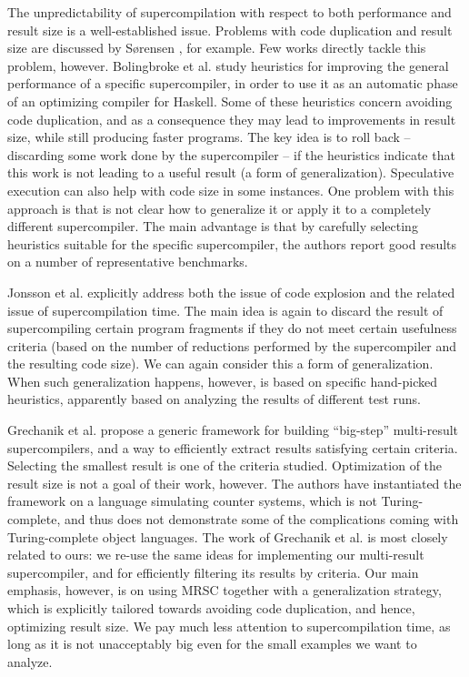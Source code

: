 \documentclass[submission,copyright,creativecommons]{eptcs}
\begin{document}
The unpredictability of supercompilation with respect to both performance and
result size is a well-established issue.
Problems with code duplication and result size are discussed by S{\o}rensen \cite{Sorensen1994TurchinSupercompiler}, 
for example.
Few works directly tackle this problem, however.
Bolingbroke et al. \cite{bolingbroke2011improving} study heuristics for improving the general
performance of a specific supercompiler, in order to use it as an automatic phase of an optimizing 
compiler for Haskell.
Some of these heuristics concern avoiding code duplication, and as a consequence they may
lead to improvements in result size, while still producing faster programs.
The key idea is to roll back -- discarding some work done by the supercompiler -- if the heuristics
indicate that this work is not leading to a useful result (a form of generalization).
Speculative execution can also help with code size in some instances.
One problem with this approach is that is not clear how to generalize it or
apply it to a completely different supercompiler.
The main advantage is that by carefully selecting heuristics suitable for the specific
supercompiler, the authors report good results on a number of representative benchmarks.

Jonsson et al. \cite{Jonsson2011Taming} explicitly address both the issue of code explosion and
the related issue of supercompilation time.
The main idea is again to discard the result of supercompiling certain program fragments
if they do not meet certain usefulness criteria (based on the number of reductions performed 
by the supercompiler and the resulting code size).
We can again consider this a form of generalization.
When such generalization happens, however, is based on specific hand-picked heuristics,
apparently based on analyzing the results of different test runs.

Grechanik et al. \cite{Romanenko2014StagedMRSC} propose a generic framework for building ``big-step''
multi-result supercompilers, and a way to efficiently extract results satisfying certain criteria.
Selecting the smallest result is one of the criteria studied.
Optimization of the result size is not a goal of their work, however.
The authors have instantiated the framework on a language simulating counter systems, which
is not Turing-complete, and thus does not demonstrate some of the complications
coming with Turing-complete object languages.
The work of Grechanik et al. \cite{Romanenko2014StagedMRSC} is most closely related to ours: 
we re-use the same ideas for implementing
our multi-result supercompiler, and for efficiently filtering its results by criteria.
Our main emphasis, however, is on using MRSC together with a generalization strategy, which
is explicitly tailored towards avoiding code duplication, and hence, optimizing result size.
We pay much less attention to supercompilation time, as long as it is not unacceptably big
even for the small examples we want to analyze.
\end{document}
